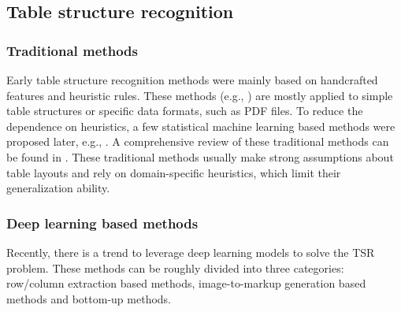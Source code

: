 \documentclass[final,3p,times,twocolumn]{elsarticle}
\begin{document}
\subsection{Table structure recognition}
\label{subsec:TSR}
\subsubsection{Traditional methods}
Early table structure recognition methods were mainly based on handcrafted features and heuristic rules. These methods (e.g., \cite{kieninger1998t,laurentini1992identifying,itonori1993table,shigarov2016configurable,rastan2019texus}) are mostly applied to simple table structures or specific data formats, such as PDF files. To reduce the dependence on heuristics, a few statistical machine learning based methods were proposed later, e.g., \cite{wang2004table}.
A comprehensive review of these traditional methods can be found in \cite{jorge2006design}. These traditional methods usually make strong assumptions about table layouts and rely on domain-specific heuristics, which limit their generalization ability.

\subsubsection{Deep learning based methods}
Recently, there is a trend to leverage deep learning models to solve the TSR problem. These methods can be roughly divided into three categories: row/column extraction based methods, image-to-markup generation based methods and bottom-up methods. 
\end{document}
